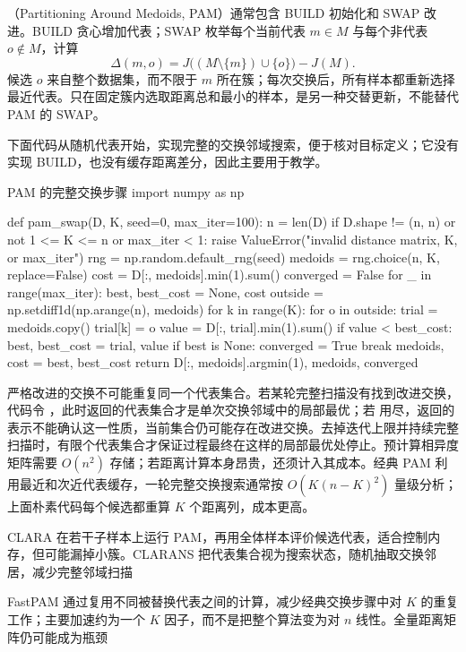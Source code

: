 （Partitioning Around Medoids, PAM）通常包含 BUILD 初始化和 SWAP 改进。BUILD 贪心增加代表；SWAP 枚举每个当前代表 $m\in M$ 与每个非代表 $o\notin M$，计算
\[
 \Delta(m,o)=
 J\bigl((M\setminus\{m\})\cup\{o\}\bigr)-J(M).
\]
候选 $o$ 来自整个数据集，而不限于 $m$ 所在簇；每次交换后，所有样本都重新选择最近代表。只在固定簇内选取距离总和最小的样本，是另一种交替更新，不能替代 PAM 的 SWAP。

下面代码从随机代表开始，实现完整的交换邻域搜索，便于核对目标定义；它没有实现 BUILD，也没有缓存距离差分，因此主要用于教学。

\begin{codeblock}[language=Python,label={code:clustering-pam}]{PAM 的完整交换步骤}
import numpy as np

def pam_swap(D, K, seed=0, max_iter=100):
    n = len(D)
    if D.shape != (n, n) or not 1 <= K <= n or max_iter < 1:
        raise ValueError("invalid distance matrix, K, or max_iter")
    rng = np.random.default_rng(seed)
    medoids = rng.choice(n, K, replace=False)
    cost = D[:, medoids].min(1).sum()
    converged = False
    for _ in range(max_iter):
        best, best_cost = None, cost
        outside = np.setdiff1d(np.arange(n), medoids)
        for k in range(K):
            for o in outside:
                trial = medoids.copy()
                trial[k] = o
                value = D[:, trial].min(1).sum()
                if value < best_cost:
                    best, best_cost = trial, value
        if best is None:
            converged = True
            break
        medoids, cost = best, best_cost
    return D[:, medoids].argmin(1), medoids, converged
\end{codeblock}

严格改进的交换不可能重复同一个代表集合。若某轮完整扫描没有找到改进交换，代码令 ，此时返回的代表集合才是单次交换邻域中的局部最优；若  用尽，返回的  表示不能确认这一性质，当前集合仍可能存在改进交换。去掉迭代上限并持续完整扫描时，有限个代表集合才保证过程最终在这样的局部最优处停止。预计算相异度矩阵需要 $O(n^2)$ 存储；若距离计算本身昂贵，还须计入其成本。经典 PAM 利用最近和次近代表缓存，一轮完整交换搜索通常按 $O(K(n-K)^2)$ 量级分析；上面朴素代码每个候选都重算 $K$ 个距离列，成本更高。

CLARA 在若干子样本上运行 PAM，再用全体样本评价候选代表，适合控制内存，但可能漏掉小簇。CLARANS 把代表集合视为搜索状态，随机抽取交换邻居，减少完整邻域扫描

FastPAM 通过复用不同被替换代表之间的计算，减少经典交换步骤中对 $K$ 的重复工作；主要加速约为一个 $K$ 因子，而不是把整个算法变为对 $n$ 线性。全量距离矩阵仍可能成为瓶颈

